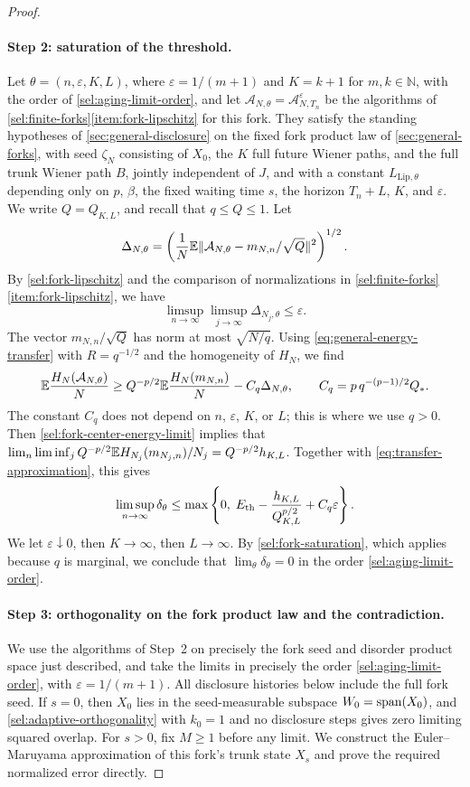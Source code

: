 \begin{proof}
\paragraph{Step 2: saturation of the threshold.}
Let $\theta=(n,\varepsilon,K,L)$, where $\varepsilon=1/(m+1)$ and
$K=k+1$ for $m,k\in\mathbb N$, with the order of
\eqref{sel:aging-limit-order}, and let
$\mathcal A_{N,\theta}=\mathcal A^\varepsilon_{N,T_n}$ be the algorithms of
\cref{sel:finite-forks}\ref{item:fork-lipschitz} for this fork. They satisfy
the standing hypotheses of \cref{sec:general-disclosure} on the fixed fork
product law of \cref{sec:general-forks}, with seed $\zeta_N$ consisting
of $X_0$, the $K$ full future Wiener paths, and the full trunk Wiener path $B$,
jointly independent of $J$, and with a constant $L_{\mathrm{Lip},\theta}$
depending only on $p$, $\beta$, the fixed waiting time $s$, the horizon
$T_n+L$, $K$, and $\varepsilon$. We write
$Q=Q_{K,L}$, and recall that $q\le Q\le1$. Let
\[
 \Delta_{N,\theta}=\left(\frac1N\mathbb E\lVert\mathcal A_{N,\theta}
 -m_{N,n}/\sqrt Q\rVert^2\right)^{1/2}.
\]
By \eqref{sel:fork-lipschitz} and the comparison of normalizations in
\cref{sel:finite-forks}\ref{item:fork-lipschitz}, we have
\begin{equation}\label{eq:transfer-approximation}
 \limsup_{n\to\infty}\limsup_{j\to\infty}\Delta_{N_j,\theta}\le\varepsilon.
\end{equation}
The vector $m_{N,n}/\sqrt Q$ has norm at most $\sqrt{N/q}$. Using
\eqref{eq:general-energy-transfer} with $R=q^{-1/2}$ and the homogeneity of
$H_N$, we find
\[
 \mathbb E\frac{H_N(\mathcal A_{N,\theta})}N
 \ge Q^{-p/2}\mathbb E\frac{H_N(m_{N,n})}N-C_q\Delta_{N,\theta},\qquad
 C_q=p\,q^{-(p-1)/2}Q_*.
\]
The constant $C_q$ does not depend on $n$, $\varepsilon$, $K$, or $L$; this
is where we use $q>0$. Then \eqref{sel:fork-center-energy-limit} implies that
$\lim_n\liminf_jQ^{-p/2}\mathbb E H_{N_j}(m_{N_j,n})/N_j=Q^{-p/2}h_{K,L}$.
Together with \eqref{eq:transfer-approximation}, this gives
\[
 \limsup_{n\to\infty}\delta_\theta
 \le\max\left\{0,\;E_{\mathrm{th}}-\frac{h_{K,L}}{Q_{K,L}^{p/2}}+C_q\varepsilon\right\}.
\]
We let $\varepsilon\downarrow0$, then $K\to\infty$, then $L\to\infty$. By
\eqref{sel:fork-saturation}, which applies because $q$ is marginal, we
conclude that $\lim_\theta\delta_\theta=0$ in the order
\eqref{sel:aging-limit-order}.

\paragraph{Step 3: orthogonality on the fork product law and the contradiction.}
We use the algorithms of Step~2 on precisely the fork seed and disorder
product space just described, and take the limits in precisely the order
\eqref{sel:aging-limit-order}, with $\varepsilon=1/(m+1)$. All disclosure
histories below include the full fork seed. If $s=0$, then $X_0$ lies in the
seed-measurable subspace $W_0=\operatorname{span}(X_0)$, and
\cref{sel:adaptive-orthogonality} with $k_0=1$ and no disclosure steps gives
zero limiting squared overlap. For $s>0$, fix $M\ge1$ before any limit.
We construct the Euler--Maruyama approximation
\cite[Sections~4--5]{higham2001} of this fork's trunk state $X_s$ and prove
the required normalized error directly.


\end{proof}
